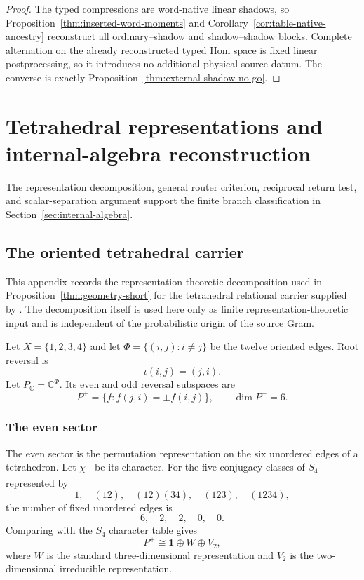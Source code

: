 \documentclass[11pt]{article}
\numberwithin{equation}{section}
\theoremstyle{definition}
\theoremstyle{remark}
\newcommand{\C}{\mathbb C}
\begin{document}
\begin{proof}
The typed compressions are word-native linear shadows, so
Proposition~\ref{thm:inserted-word-moments} and
Corollary~\ref{cor:table-native-ancestry} reconstruct all ordinary--shadow and
shadow--shadow blocks.  Complete alternation on the already reconstructed typed
Hom space is fixed linear postprocessing, so it introduces no additional
physical source datum.  The converse is exactly
Proposition~\ref{thm:external-shadow-no-go}.
\end{proof}


\section{Tetrahedral representations and internal-algebra reconstruction}
\label{app:internal-landing}

The representation decomposition, general router criterion, reciprocal
return test, and scalar-separation argument support the finite branch
classification in Section~\ref{sec:internal-algebra}.


\subsection{The oriented tetrahedral carrier}
\label{app:S4}

This appendix records the representation-theoretic decomposition used in
Proposition~\ref{thm:geometry-short} for the tetrahedral relational carrier
supplied by \cite{PelissierSpacetime2026}.  The decomposition itself is used
here only as finite representation-theoretic input and is independent of the
probabilistic origin of the source Gram.

Let $X=\{1,2,3,4\}$ and let $\Phi=\{(i,j):i\ne j\}$ be the twelve oriented
edges.  Root reversal is
\[
\iota(i,j)=(j,i).
\]
Let $P_\C=\C^\Phi$.  Its even and odd reversal subspaces are
\[
P^\pm=\{f:f(j,i)=\pm f(i,j)\},
\qquad
\dim P^\pm=6.
\]

\subsubsection{The even sector}

The even sector is the permutation representation on the six unordered edges
of a tetrahedron.  Let $\chi_+$ be its character.  For the five conjugacy
classes of $S_4$ represented by
\[
1,\quad (12),\quad (12)(34),\quad (123),\quad (1234),
\]
the number of fixed unordered edges is
\[
6,\quad 2,\quad 2,\quad 0,\quad 0.
\]
Comparing with the $S_4$ character table gives
\begin{equation}
P^+
\cong
\mathbf1\oplus W\oplus V_2,
\label{eq:appendix-even}
\end{equation}
where $W$ is the standard three-dimensional representation and $V_2$ is the
two-dimensional irreducible representation.
\end{document}
